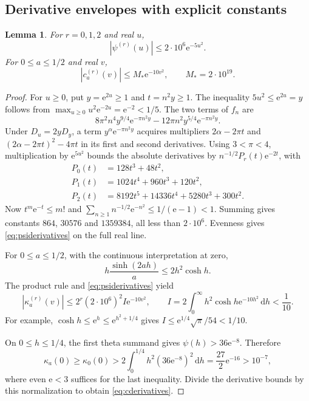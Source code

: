 \documentclass[11pt,letterpaper]{article}
\numberwithin{equation}{section}
\newtheorem{lemma}[theorem]{Lemma}
\theoremstyle{remark}\newtheorem{remark}[theorem]{Remark}
\newcommand{\dd}{\,\mathrm d}
\newcommand{\ee}{\mathrm e}
\begin{document}
\subsection{Derivative envelopes with explicit constants}
\begin{lemma}\label{lem:derivatives}
For $r=0,1,2$ and real $u$,
\begin{equation}\label{eq:psiderivatives}
|\psi^{(r)}(u)|\le2\cdot10^6\ee^{-5u^2}.
\end{equation}
For $0\le a\le1/2$ and real $v$,
\begin{equation}\label{eq:cderivatives}
|c_a^{(r)}(v)|\le M_*\ee^{-10v^2},\qquad M_*=2\cdot10^{19}.
\end{equation}
\end{lemma}
\begin{proof}
For $u\ge0$, put $y=\ee^{2u}\ge1$ and $t=n^2y\ge1$. The inequality $5u^2\le\ee^{2u}=y$ follows from $\max_{u\ge0}u^2\ee^{-2u}=\ee^{-2}<1/5$.
The two terms of $f_n$ are
\[
8\pi^2n^4y^{9/4}\ee^{-\pi n^2y}
-12\pi n^2y^{5/4}\ee^{-\pi n^2y}.
\]
Under $D_u=2yD_y$, a term $y^\alpha\ee^{-\pi n^2y}$ acquires multipliers $2\alpha-2\pi t$ and $(2\alpha-2\pi t)^2-4\pi t$ in its first and second derivatives. Using $3<\pi<4$, multiplication by $\ee^{5u^2}$ bounds the absolute derivatives by $n^{-1/2}P_r(t)\ee^{-2t}$, with
\begin{align}
P_0(t)&=128t^3+48t^2,\\
P_1(t)&=1024t^4+960t^3+120t^2,\\
P_2(t)&=8192t^5+14336t^4+5280t^3+300t^2.
\end{align}
Now $t^m\ee^{-t}\le m!$ and
$\sum_{n\ge1}n^{-1/2}\ee^{-n^2}\le1/(\ee-1)<1$. Summing gives constants $864$, $30576$ and $1359384$, all less than $2\cdot10^6$. Evenness gives \eqref{eq:psiderivatives} on the full real line.

For $0\le a\le1/2$, with the continuous interpretation at zero,
\[
h\frac{\sinh(2ah)}a\le2h^2\cosh h.
\]
The product rule and \eqref{eq:psiderivatives} yield
\[
|\kappa_a^{(r)}(v)|\le2^r(2\cdot10^6)^2 I\ee^{-10v^2},\qquad
I=2\int_0^\infty h^2\cosh h\ee^{-10h^2}\dd h<\frac1{10}.
\]
For example, $\cosh h\le\ee^h\le\ee^{h^2+1/4}$ gives $I\le\ee^{1/4}\sqrt\pi/54<1/10$.

On $0\le h\le1/4$, the first theta summand gives $\psi(h)>36\ee^{-8}$. Therefore
\[
\kappa_a(0)\ge\kappa_0(0)>2\int_0^{1/4}h^2(36\ee^{-8})^2\dd h
=\frac{27}{2}\ee^{-16}>10^{-7},
\]
where even $\ee<3$ suffices for the last inequality. Divide the derivative bounds by this normalization to obtain \eqref{eq:cderivatives}.
\end{proof}
\end{document}
